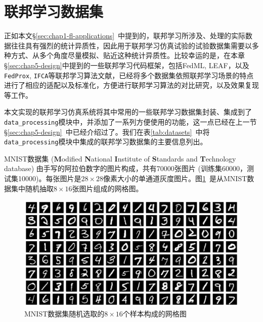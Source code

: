 \section{联邦学习数据集}
\label{sec:chap5-datasets}


正如本文\S\ref{sec:chap1-fl-applications}~中提到的，联邦学习所涉及、处理的实际数据往往具有强烈的统计异质性，因此用于联邦学习仿真试验的试验数据集需要以多种方式、从多个角度尽量模拟、贴近这种统计异质性。比较幸运的是，在本章\S\ref{sec:chap5-design}中提到的一些联邦学习代码框架，包括FedML\cite{he_2020_fedml}, LEAF\cite{caldas2018_leaf}，以及\texttt{FedProx}\cite{sahu2018fedprox}, \texttt{IFCA}\cite{Ghosh_2022_cfl}等联邦学习算法文献，已经将多个数据集依照联邦学习场景的特点进行了相应的适配以及标准化，方便进行联邦学习算法的对比研究，以及效果复现等工作。

本文实现的联邦学习仿真系统将其中常用的一些联邦学习数据集封装、集成到了\texttt{data\_processing}模块中，并添加了一系列方便使用的功能，这一点已经在上一节\S\ref{sec:chap5-design}~中已经介绍过了。我们在表\ref{tab:datasets}~中将\texttt{data\_processing}模块中集成的联邦学习数据集的主要信息列出。



MNIST数据集 (\textbf{M}odified \textbf{N}ational \textbf{I}nstitute of \textbf{S}tandards and \textbf{T}echnology database) \cite{Lecun_1998_mnist}由手写的阿拉伯数字的图片构成，共有70000张图片 (训练集60000，测试集10000)。每张图片是$28\times 28$像素大小的单通道灰度图片。图\ref{fig:mnist_random_grid_view}~是从MNIST数据集中随机抽取$8\times 16$张图片组成的网格图。

\begin{figure}[ht]
\centering
\includegraphics[width=\textwidth]{figures/mnist_random_grid_view.pdf}
\caption{MNIST数据集随机选取的$8\times 16$个样本构成的网格图}
\label{fig:mnist_random_grid_view}
\end{figure}

